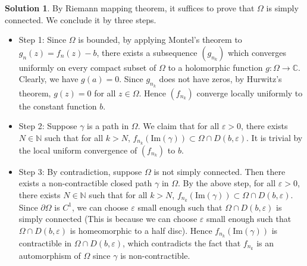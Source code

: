 \documentclass{article}
\theoremstyle{definition}
\newtheorem{solution}{Solution}
\newcommand{\N}{\mathbb{N}}
\newcommand{\C}{\mathbb{C}}
\newcommand{\im}{\mathrm{Im}}
\begin{document}
\begin{solution}
    By Riemann mapping theorem, it suffices to prove that $\Omega$ is simply connected. We conclude it by three steps.
    \begin{itemize}
        \item Step 1: Since $\Omega$ is bounded, by applying Montel's theorem to $g_n(z)=f_n(z)-b$, there exists a subsequence $(g_{n_k})$ which converges uniformly on every compact subset of $\Omega$ to a holomorphic function $g \colon \Omega \to \C$. Clearly, we have $g(a)=0$.
        Since $g_{n_k}$ does not have zeros, by Hurwitz's theorem, $g(z)=0$ for all $z\in \Omega$. Hence $(f_{n_k})$ converge locally uniformly to the constant function $b$.
        \item Step 2: Suppose $\gamma$ is a path in $\Omega$. We claim that for all $\varepsilon>0$, there exists $N\in\N$ such that for all $k>N$, $f_{n_k}(\im(\gamma))\subset \Omega\cap D(b,\varepsilon)$. It is trivial by the local uniform convergence of $(f_{n_k})$ to $b$.
        \item Step 3: By contradiction, suppose $\Omega$ is not simply connected. Then there exists a non-contractible closed path $\gamma$ in $\Omega$. By the above step, for all $\varepsilon>0$, there exists $N\in\N$ such that for all $k>N$, $f_{n_k}(\im(\gamma))\subset \Omega\cap D(b,\varepsilon)$. 
        Since $\partial \Omega$ is $C^1$, we can choose $\varepsilon$ small enough such that $\Omega\cap D(b,\varepsilon)$ is simply connected (This is because we can choose $\varepsilon$ small enough such that $\Omega\cap D(b,\varepsilon)$ is homeomorphic to a half disc). Hence $f_{n_k}(\im(\gamma))$ is contractible in $\Omega\cap D(b,\varepsilon)$, which contradicts the fact that $f_{n_k}$ is an automorphism of $\Omega$ since $\gamma$ is non-contractible. \qedsymbol
    \end{itemize} 
\end{solution}
\end{document}
